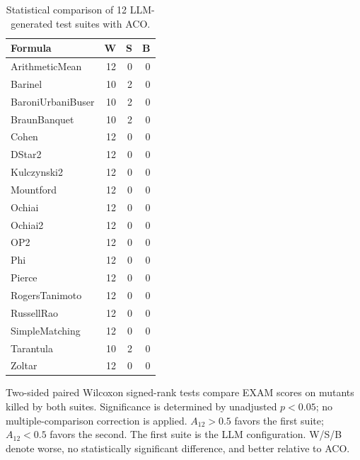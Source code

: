 \begin{table}[t]
\centering
\caption{Statistical comparison of 12 LLM-generated test suites with ACO.}
\label{tab:rq3bw-pairwise-counts}
\begin{tabular}{lrrr}
\toprule
Formula & W & S & B \\
\midrule
ArithmeticMean & 12 & 0 & 0 \\
Barinel & 10 & 2 & 0 \\
BaroniUrbaniBuser & 10 & 2 & 0 \\
BraunBanquet & 10 & 2 & 0 \\
Cohen & 12 & 0 & 0 \\
DStar2 & 12 & 0 & 0 \\
Kulczynski2 & 12 & 0 & 0 \\
Mountford & 12 & 0 & 0 \\
Ochiai & 12 & 0 & 0 \\
Ochiai2 & 12 & 0 & 0 \\
OP2 & 12 & 0 & 0 \\
Phi & 12 & 0 & 0 \\
Pierce & 12 & 0 & 0 \\
RogersTanimoto & 12 & 0 & 0 \\
RussellRao & 12 & 0 & 0 \\
SimpleMatching & 12 & 0 & 0 \\
Tarantula & 10 & 2 & 0 \\
Zoltar & 12 & 0 & 0 \\
\bottomrule
\end{tabular}
\par\smallskip
\begin{minipage}{\linewidth}\footnotesize Two-sided paired Wilcoxon signed-rank tests compare EXAM scores on mutants killed by both suites. Significance is determined by unadjusted $p<0.05$; no multiple-comparison correction is applied. $A_{12}>0.5$ favors the first suite; $A_{12}<0.5$ favors the second. The first suite is the LLM configuration. W/S/B denote worse, no statistically significant difference, and better relative to ACO.
\end{minipage}
\end{table}
